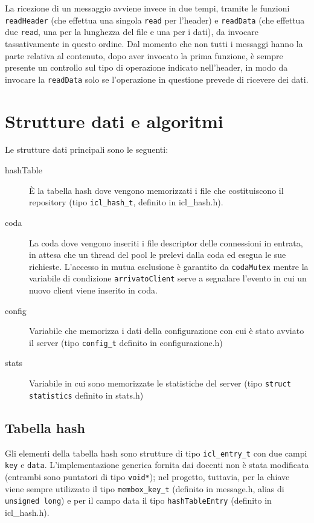 \documentclass[a4paper,12pt]{article}
\begin{document}
La ricezione di un messaggio avviene invece in due tempi, tramite le funzioni \texttt{readHeader} (che effettua una singola \texttt{read} per l'header) e \texttt{readData} (che effettua due \texttt{read}, una per la lunghezza del file e una per i dati), da invocare tassativamente in questo ordine. Dal momento che non tutti i messaggi hanno la parte relativa al contenuto, dopo aver invocato la prima funzione, è sempre presente un controllo sul tipo di operazione indicato nell'header, in modo da invocare la \texttt{readData} solo se l'operazione in questione prevede di ricevere dei dati.

\section{ Strutture dati e algoritmi }

Le strutture dati principali sono le seguenti:

\begin{description}
 \item[hashTable] \` E la tabella hash dove vengono memorizzati i file che costituiscono il repository (tipo \texttt{icl\_hash\_t}, definito in icl\_hash.h).
 \item[coda] La coda dove vengono inseriti i file descriptor delle connessioni in entrata, in attesa che un thread del pool le prelevi dalla coda ed esegua le sue richieste. L'accesso in mutua esclusione è garantito da \texttt{codaMutex} mentre la variabile di condizione \texttt{arrivatoClient} serve a segnalare l'evento in cui un nuovo client viene inserito in coda.
 \item[config] Variabile che memorizza i dati della configurazione con cui è stato avviato il server (tipo \texttt{config\_t} definito in configurazione.h)
 \item[stats] Variabile in cui sono memorizzate le statistiche del server (tipo \texttt{struct statistics} definito in stats.h)
\end{description}

\subsection{ Tabella hash }

Gli elementi della tabella hash sono strutture di tipo \texttt{icl\_entry\_t} con due campi \texttt{key} e \texttt{data}. L'implementazione generica fornita dai docenti non è stata modificata (entrambi sono puntatori di tipo \texttt{void*}); nel progetto, tuttavia, per la chiave viene sempre utilizzato il tipo \texttt{membox\_key\_t} (definito in message.h, alias di \texttt{unsigned long}) e per il campo data il tipo \texttt{hashTableEntry} (definito in icl\_hash.h).
\end{document}
